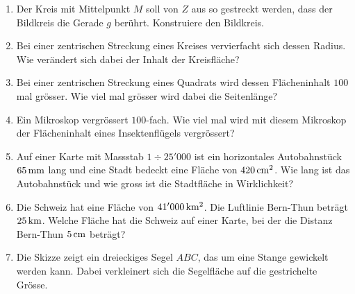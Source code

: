 \documentclass[%
11pt,%
twoside,%
titlepage,%
a4page,%
headsepline%
]{scrartcl}
\begin{document}
\begin{enumerate}
\item Der Kreis mit Mittelpunkt $M$ soll von $Z$ aus so gestreckt werden, dass der Bildkreis die Gerade $g$ ber\"uhrt. Konstruiere den Bildkreis.
\begin{center}
\end{center}
\item Bei einer zentrischen Streckung eines Kreises vervierfacht sich dessen Radius. Wie ver\"andert sich dabei der Inhalt der Kreisfl\"ache?
\item Bei einer zentrischen Streckung eines Quadrats wird dessen Fl\"acheninhalt $100$ mal gr\"osser. Wie viel mal gr\"osser wird dabei die Seitenl\"ange?
\item Ein Mikroskop vergr\"ossert $100$-fach. Wie viel mal wird mit diesem Mikroskop der Fl\"acheninhalt eines Insektenfl\"ugels vergr\"ossert?
\item Auf einer Karte mit Massstab $1\div25'000$ ist ein horizontales Autobahnst\"uck $\unit[65]{mm}$ lang und eine Stadt bedeckt eine Fl\"ache von $\unit[420]{cm^2}$. Wie lang ist das Autobahnst\"uck und wie gross ist die Stadtfl\"ache in Wirklichkeit?
\item Die Schweiz hat eine Fl\"ache von $\unit[41'000]{km^2}$. Die Luftlinie Bern-Thun betr\"agt $\unit[25]{km}$. Welche Fl\"ache hat die Schweiz auf einer Karte, bei der die Distanz Bern-Thun $\unit[5]{cm}$ betr\"agt?
\item Die Skizze zeigt ein dreieckiges Segel $ABC$, das um eine Stange gewickelt werden kann. Dabei verkleinert sich die Segelfl\"ache auf die gestrichelte Gr\"osse.
\begin{center}
\end{center}
\end{enumerate}
\end{document}
